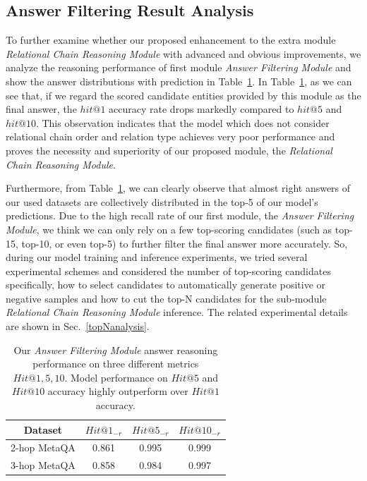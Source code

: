 \documentclass[pdflatex,sn-mathphys]{sn-jnl}%
\theoremstyle{thmstyleone}%
\theoremstyle{thmstyletwo}%
\theoremstyle{thmstylethree}%
\begin{document}
\subsection{Answer Filtering Result Analysis}
To further examine whether our proposed enhancement to the extra module \textit{Relational Chain Reasoning Module} with advanced and obvious improvements, we analyze the reasoning performance of first module \textit{Answer Filtering Module} and show the answer distributions with prediction in Table~\ref{comparison_hit1}. In Table~\ref{comparison_hit1}, as we can see that, if we regard the scored candidate entities provided by this module as the final answer, the $hit@1$ accuracy rate drops markedly compared to $hit@5$ and $hit@10$. This observation indicates that the model which does not consider relational chain order and relation type achieves very poor performance and proves the necessity and superiority of our proposed module, the \textit{Relational Chain Reasoning Module}.

Furthermore, from Table~\ref{comparison_hit1}, we can clearly observe that almost right answers of our used datasets are collectively distributed in the top-5 of our model's predictions. Due to the high recall rate of our first module, the \textit{Answer Filtering Module}, we think we can only rely on a few top-scoring candidates (such as top-15, top-10, or even top-5) to further filter the final answer more accurately. So, during our model training and inference experiments, we tried several experimental schemes and considered the number of top-scoring candidates specifically, how to select candidates to automatically generate positive or negative samples and how to cut the top-N candidates for the sub-module \textit{Relational Chain Reasoning Module} inference. The related experimental details are shown in Sec.~\ref{topNanalysis}.

\label{topNanalysis}

\begin{table}[h]
    \centering
    \begin{tabular}{c|c|c|c} \hline
        Dataset & $Hit@1_{-r}$ & $Hit@5_{-r}$ & $Hit@10_{-r}$ \\ \hline
        2-hop MetaQA  & 0.861 & 0.995 & 0.999 \\
        3-hop MetaQA  & 0.858 & 0.984 & 0.997 \\ \hline
    \end{tabular}
    \caption{Our \textit{Answer Filtering Module} answer reasoning performance on three different metrics $Hit@1, 5, 10$. Model performance on $Hit@5$ and $Hit@10$ accuracy highly outperform over $Hit@1$ accuracy.}
    \label{comparison_hit1}
\end{table}
\end{document}
